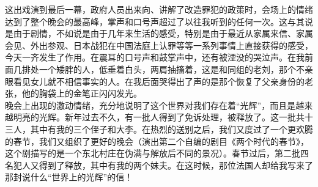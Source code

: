 这出戏演到最后一幕，政府人员出来向、讲解了改造罪犯的政策时，会场上的情绪达到了整个晚会的最高峰，掌声和口号声超过了以往我听到的任何一次。这与其说是由于剧情，不如说是由于几年来生活的感受，特别是由于最近从家属来信、家属会见、外出参观、日本战犯在中国法庭上认罪等等一系列事情上直接获得的感受，今天一齐发生了作用。在震耳的口号声和鼓掌声中，还有被湮没的哭泣声。在我前面几排处一个矮胖的人，低垂着白头，两肩抽搐着，这是和同组的老刘，那个不亲眼看见女儿就不相信事实的人。在我后面哭得出了声的是那个恢复了父亲身份的老张，他的胸袋上的金笔正闪闪发光。\\

晚会上出现的激动情绪，充分地说明了这个世界对我们存在着“光辉”，而且是越来越明亮的光辉。新年过去不久，有一批人得到了免诉处理，被释放了。这一批共十三人，其中有我的三个侄子和大李。在热烈的送别之后，我们又度过了一个更欢腾的春节，我们又组织了更好的晚会（演出第二个自编的剧目《两个时代的春节》，这个剧描写的是一个东北村庄在伪满与解放后不同的景况）。春节过后，第二批四名犯人又得到了释放，其中有我的两个妹夫。在这时候，那位法国人却给我写来了那封说什么“世界上的光辉”的信！
